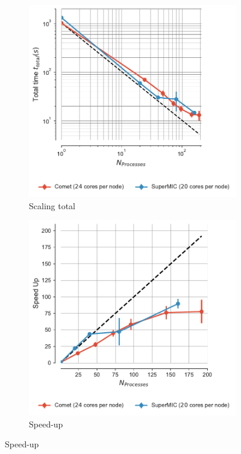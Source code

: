 \begin{figure}[!htb]
  \centering
  \begin{subfigure}{.4\textwidth}
    \includegraphics[width=\linewidth]{figures/Comparison_t-tot-clusters_Splitting.pdf}
    \caption{Scaling total}
    \label{fig:MPIscaling-clusters-splitting}
  \end{subfigure}
  \hfill
  \begin{subfigure}{.4\textwidth}
    \includegraphics[width=\linewidth]{figures/Comparison_speed-up-clusters_Splitting.pdf}
    \caption{Speed-up}
    \label{fig:MPIspeedup-clusters-splitting}
  \end{subfigure}
  \bigskip


\end{figure}
